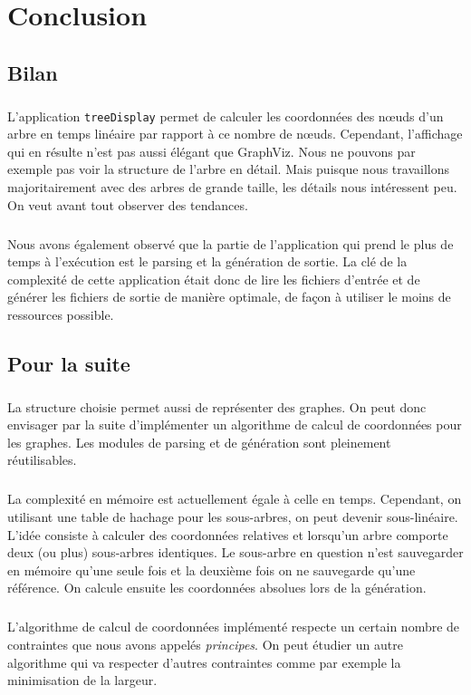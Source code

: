 \chapter{Conclusion}

\section{Bilan}
\paragraph{}L'application \verb|treeDisplay| permet de calculer les coordonnées des n\oe uds d'un arbre en temps linéaire par rapport à ce nombre de n\oe uds. Cependant, l'affichage qui en résulte n'est pas aussi élégant que GraphViz. Nous ne pouvons par exemple pas voir la structure de l'arbre en détail. Mais puisque nous travaillons majoritairement avec des arbres de grande taille, les détails nous intéressent peu. On veut avant tout observer des tendances. 
\paragraph{} Nous avons également observé que la partie de l'application qui prend le plus de temps à l'exécution est le parsing et la génération de sortie. La clé de la complexité de cette application était donc de lire les fichiers d'entrée et de générer les fichiers de sortie de manière optimale, de façon à utiliser le moins de ressources possible.

\section{Pour la suite}

\paragraph{}La structure choisie permet aussi de représenter des graphes. On peut donc envisager par la suite d'implémenter un algorithme de calcul de coordonnées pour les graphes. Les modules de parsing et de génération sont pleinement réutilisables.

\paragraph{}La complexité en mémoire est actuellement égale à celle en temps. Cependant, on utilisant une table de hachage pour les sous-arbres, on peut devenir sous-linéaire. L'idée consiste à calculer des coordonnées relatives et lorsqu'un arbre comporte deux (ou plus) sous-arbres identiques. Le sous-arbre en question n'est sauvegarder en mémoire qu'une seule fois et la deuxième fois on ne sauvegarde qu'une référence. On calcule ensuite les coordonnées absolues lors de la génération.

\paragraph{}L'algorithme de calcul de coordonnées implémenté respecte un certain nombre de contraintes que nous avons appelés \emph{principes}. On peut étudier un autre algorithme qui va respecter d'autres contraintes comme par exemple la minimisation de la largeur.